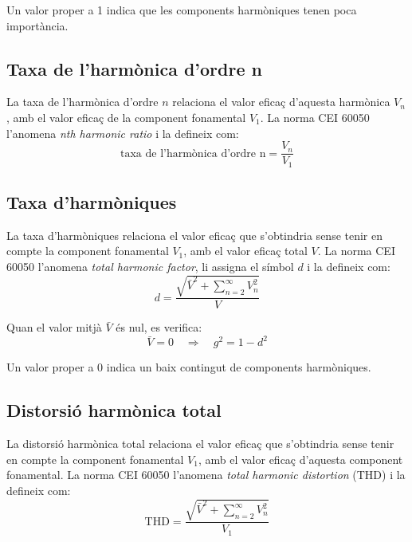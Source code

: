 Un valor proper a 1 indica  que les components harmòniques tenen poca importància.

\subsection{Taxa de l'harmònica d'ordre n}

La taxa de l'harmònica d'ordre $n$  relaciona el valor eficaç d'aquesta harmònica  $V_n$, amb el valor eficaç de la component fonamental
 $V_1$. La norma CEI 60050 l'anomena \textit{nth harmonic ratio} i la defineix com:
\begin{equation}
    \text{taxa de l'harmònica d'ordre n} = \frac{V_n}{V_1}
\end{equation}


\subsection{Taxa d'harmòniques}
 

La taxa d'harmòniques relaciona el valor eficaç  que
s'obtindria sense tenir en compte  la component fonamental $V_1$, amb el valor
eficaç total $V$. La norma CEI 60050 l'anomena \textit{total harmonic factor}, li assigna el símbol $d$ i la defineix com:
\begin{equation}
    d = \frac{\sqrt{\bar{V}^2+\displaystyle\sum_{n=2}^\infty V^2_n}}{V}
\end{equation}

Quan el valor mitjà $\bar{V}$ és nul, es verifica:
\begin{equation}
    \bar{V}=0 \quad \Rightarrow\quad g^2 = 1 - d^2
\end{equation}

Un valor proper a 0 indica un baix contingut de components harmòniques.

\subsection{Distorsió harmònica total} 

 La distorsió harmònica total  relaciona el valor eficaç  que
s'obtindria sense tenir en compte  la component fonamental $V_1$,
amb el valor eficaç d'aquesta component fonamental. La norma CEI 60050 l'anomena \textit{total harmonic distortion} (THD) i la defineix com:
\begin{equation}
    \text{THD} = \frac{\sqrt{\bar{V}^2+  \displaystyle\sum_{n=2}^\infty V^2_n}} {V_1}
\end{equation}


